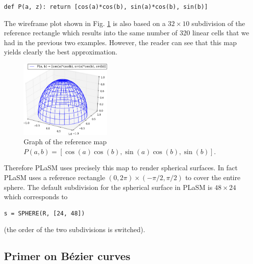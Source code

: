 \begin{bbox}
\begin{verbatim}
def P(a, z): return [cos(a)*cos(b), sin(a)*cos(b), sin(b)]
\end{verbatim}
\end{bbox}
\vspace{6mm}

\noindent
The wireframe plot shown in Fig. \ref{fig:paramsu8} is also based on a
$32 \times 10$ subdivision of the reference rectangle which results into the 
same number of 320 linear cells that we had in the previous two examples.
However, the reader can see that this map yields clearly the best approximation. \\[-7mm]

\begin{figure}[!ht]
\begin{center}
\includegraphics[width=0.4\textwidth]{img/paramsu8.png}
\end{center}
\vspace{-6mm}
\caption{Graph of the reference map $P(a, b) = \left[\cos(a)\cos(b), \sin(a)\cos(b), \sin(b)\right]$.}
\label{fig:paramsu8}
\vspace{-1cm}
\end{figure}
\newpage
\noindent
Therefore PLaSM uses precisely this map to 
render spherical surfaces. In fact PLaSM uses a reference rectangle $(0, 2\pi)\times(-\pi/2, \pi/2)$
to cover the entire sphere. The default subdivision for the spherical surface in PLaSM
is $48 \times 24$ which corresponds to\\

\begin{bbox}
\begin{verbatim}
s = SPHERE(R, [24, 48])
\end{verbatim}
\end{bbox}
\vspace{6mm}

\noindent
{}
(the order of the two subdivisions is switched).
\subsection{Primer on B\'ezier curves}

